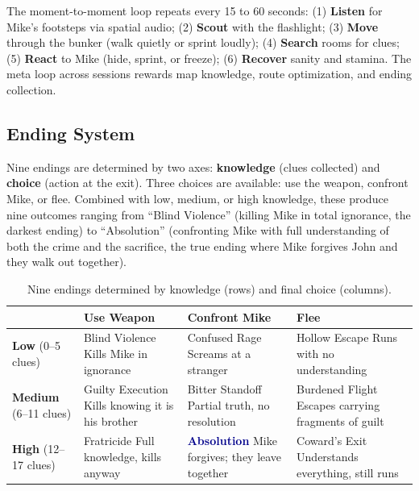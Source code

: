 \documentclass[12pt, letterpaper]{article}
\begin{document}
The moment-to-moment loop repeats every 15 to 60 seconds: (1) \textbf{Listen} for Mike's footsteps via spatial audio; (2) \textbf{Scout} with the flashlight; (3) \textbf{Move} through the bunker (walk quietly or sprint loudly); (4) \textbf{Search} rooms for clues; (5) \textbf{React} to Mike (hide, sprint, or freeze); (6) \textbf{Recover} sanity and stamina. The meta loop across sessions rewards map knowledge, route optimization, and ending collection.

\subsection{Ending System}

Nine endings are determined by two axes: \textbf{knowledge} (clues collected) and \textbf{choice} (action at the exit). Three choices are available: use the weapon, confront Mike, or flee. Combined with low, medium, or high knowledge, these produce nine outcomes ranging from ``Blind Violence'' (killing Mike in total ignorance, the darkest ending) to ``Absolution'' (confronting Mike with full understanding of both the crime and the sacrifice, the true ending where Mike forgives John and they walk out together).

\begin{table}[h]
\centering
\small
\renewcommand{\arraystretch}{1.4}
\begin{tabular}{@{}p{2cm}|p{3.5cm}|p{3.5cm}|p{3.5cm}@{}}
\toprule
& \textbf{Use Weapon} & \textbf{Confront Mike} & \textbf{Flee} \\
\midrule
\textbf{Low} \newline (0--5 clues) & \textcolor{accentred}{Blind Violence} \newline Kills Mike in ignorance & Confused Rage \newline Screams at a stranger & Hollow Escape \newline Runs with no understanding \\
\midrule
\textbf{Medium} \newline (6--11 clues) & Guilty Execution \newline Kills knowing it is his brother & Bitter Standoff \newline Partial truth, no resolution & Burdened Flight \newline Escapes carrying fragments of guilt \\
\midrule
\textbf{High} \newline (12--17 clues) & Fratricide \newline Full knowledge, kills anyway & \textcolor{darkblue}{\textbf{Absolution}} \newline Mike forgives; they leave together & Coward's Exit \newline Understands everything, still runs \\
\bottomrule
\end{tabular}
\caption{Nine endings determined by knowledge (rows) and final choice (columns).}
\end{table}
\end{document}
